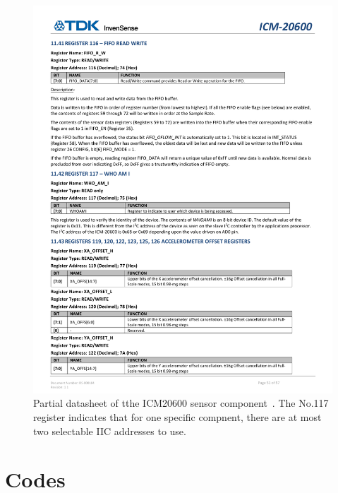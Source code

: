 \documentclass[12pt, a4paper]{report}
\begin{document}
\begin{figure}[htbp]
	\centering
	\includegraphics[width=1.1\textwidth]{
		fileForWriting/only two modifiable IIC address}
	\caption[Datasheet of the ICM20600 sensor component.]{Partial datasheet of tthe ICM20600 sensor component~\cite{invensense-icm20600-datasheet}. The No.117 register indicates that for one specific compnent, there are at most two selectable IIC addresses to use.}
	\label{fig:limited-IIC-address}
\end{figure}

\chapter{Codes}

\end{document}
